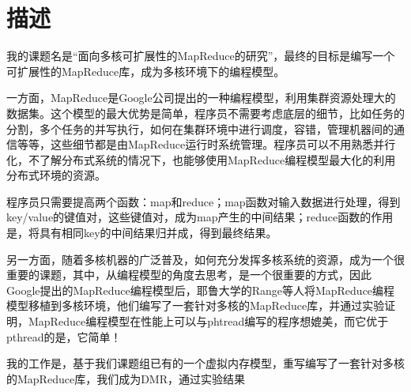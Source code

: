 \section{描述}
我的课题名是“面向多核可扩展性的MapReduce的研究”，最终的目标是编写一个可扩展性的MapReduce库，成为多核环境下的编程模型。

一方面，MapReduce是Google公司提出的一种编程模型，利用集群资源处理大的数据集。这个模型的最大优势是简单，程序员不需要考虑底层的细节，比如任务的分割，多个任务的并写执行，如何在集群环境中进行调度，容错，管理机器间的通信等等，这些细节都是由MapReduce运行时系统管理。程序员可以不用熟悉并行化，不了解分布式系统的情况下，也能够使用MapReduce编程模型最大化的利用分布式环境的资源。

程序员只需要提高两个函数：map和reduce；map函数对输入数据进行处理，得到key/value的键值对，这些键值对，成为map产生的中间结果；reduce函数的作用是，将具有相同key的中间结果归并成，得到最终结果。

另一方面，随着多核机器的广泛普及，如何充分发挥多核系统的资源，成为一个很重要的课题，其中，从编程模型的角度去思考，是一个很重要的方式，因此Google提出的MapReduce编程模型后，耶鲁大学的Range等人将MapReduce编程模型移植到多核环境，他们编写了一套针对多核的MapReduce库，并通过实验证明，MapReduce编程模型在性能上可以与phtread编写的程序想媲美，而它优于pthread的是，它简单！

我的工作是，基于我们课题组已有的一个虚拟内存模型，重写编写了一套针对多核的MapReduce库，我们成为DMR，通过实验结果


